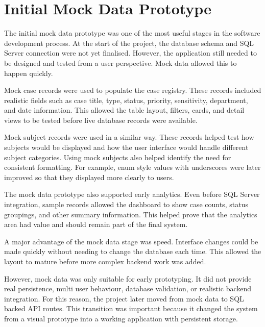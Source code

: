 \section{Initial Mock Data Prototype}

The initial mock data prototype was one of the most useful stages in the software development process. At the start of the project, the database schema and SQL Server connection were not yet finalised. However, the application still needed to be designed and tested from a user perspective. Mock data allowed this to happen quickly.

Mock case records were used to populate the case registry. These records included realistic fields such as case title, type, status, priority, sensitivity, department, and date information. This allowed the table layout, filters, cards, and detail views to be tested before live database records were available.

Mock subject records were used in a similar way. These records helped test how subjects would be displayed and how the user interface would handle different subject categories. Using mock subjects also helped identify the need for consistent formatting. For example, enum style values with underscores were later improved so that they displayed more clearly to users.

The mock data prototype also supported early analytics. Even before SQL Server integration, sample records allowed the dashboard to show case counts, status groupings, and other summary information. This helped prove that the analytics area had value and should remain part of the final system.

A major advantage of the mock data stage was speed. Interface changes could be made quickly without needing to change the database each time. This allowed the layout to mature before more complex backend work was added.

However, mock data was only suitable for early prototyping. It did not provide real persistence, multi user behaviour, database validation, or realistic backend integration. For this reason, the project later moved from mock data to SQL backed API routes. This transition was important because it changed the system from a visual prototype into a working application with persistent storage.


